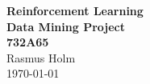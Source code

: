 \documentclass[report.tex]{subfiles}
\begin{document}
\begin{titlepage}
  \begin{center}
    \Large\textbf{%
      \Huge Reinforcement Learning \\
      \Large Data Mining Project \\
      732A65
    } \\
    \vspace{2.5mm}
    \large Rasmus Holm \\
    \vfill
    \large \today
  \end{center}
\end{titlepage}
\end{document}
